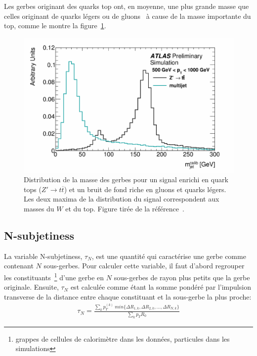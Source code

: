 Les gerbes originant des quarks top ont, en moyenne, une plus grande
masse que celles originant de quarks légers ou de
gluons~\cite{_boosted_2015} à cause de la masse importante du top, comme le montre la
figure~\ref{fig:mass_distr}.

\begin{figure}
  \centering
  \includegraphics[width=.5\textwidth]{mass_distr.pdf}
  \caption{Distribution de la masse des gerbes pour un
    signal enrichi en quark tops ($Z' \rightarrow t\overline{t}$) et
    un bruit de fond riche en gluons et quarks légers. Les deux maxima
    de la distribution du signal correspondent aux masses du $W$ et du
    top. Figure tirée de la référence~\cite{_boosted_2015}.}
  \label{fig:mass_distr}
\end{figure}


\subsection{N-subjetiness}
\label{sec:top:sous_structure:tau_ij}

La variable N-subjetiness, $\tau_N$, est une quantité qui caractérise
une gerbe comme contenant $N$ sous-gerbes. Pour calculer cette
variable, il faut d'abord regrouper les constituants~\footnote{grappes
  de cellules de calorimètre dans les données, particules dans les
  simulations} d'une gerbe en $N$ sous-gerbes de rayon plus petits que
la gerbe originale. Ensuite, $\tau_N$ est calculée comme étant la
somme pondéré par l'impulsion transverse de la distance entre chaque
constituant et la sous-gerbe la plus proche:
\begin{eqnarray}
  \tau_N = \frac{\sum_kp_T^{(k)}\ min\{\Delta R_{1,k},\Delta R_{2,k},\ldots,\Delta R_{N,k}\}}{\sum_kp_TR_0}
\end{eqnarray}

